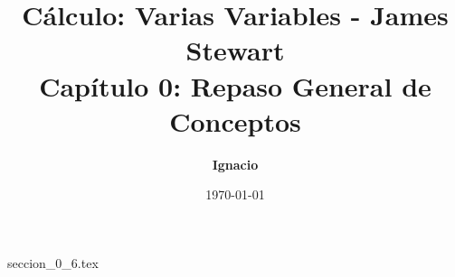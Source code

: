 \documentclass[11pt,spanish,oneside]{report}
\title{\textbf{Cálculo: Varias Variables - James Stewart} \\ \Large Capítulo 0: Repaso General de Conceptos}
\author{\textbf{Ignacio}}
\date{\today}
\begin{document}
\maketitle

{seccion_0_6.tex}
\end{document}
